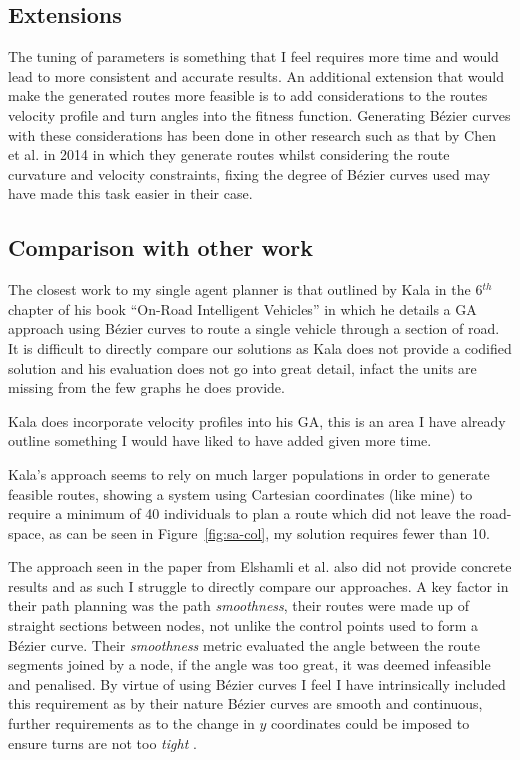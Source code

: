 \subsection{Extensions}

The tuning of parameters is something that I feel requires more time and would lead to more consistent and accurate results. An additional extension that would make the generated routes more feasible is to add considerations to the routes velocity profile and turn angles into the fitness function. Generating Bézier curves with these considerations has been done in other research such as that by Chen et al.\cite{chenQuarticBezierCurve2014} in 2014 in which they generate routes whilst considering the route curvature and velocity constraints, fixing the degree of Bézier curves used may have made this task easier in their case.

\subsection{Comparison with other work}

The closest work to my single agent planner is that outlined by Kala in the 6$^{th}$ chapter of his book ``On-Road Intelligent Vehicles'' in which he details a GA approach using Bézier curves to route a single vehicle through a section of road. It is difficult to directly compare our solutions as Kala does not provide a codified solution and his evaluation does not go into great detail, infact the units are missing from the few graphs he does provide.

Kala does incorporate velocity profiles into his GA, this is an area I have already outline something I would have liked to have added given more time.

Kala's approach seems to rely on much larger populations in order to generate feasible routes, showing a system using Cartesian coordinates (like mine) to require a minimum of 40 individuals to plan a route which did not leave the road-space, as can be seen in Figure~\ref{fig:sa-col}, my solution requires fewer than 10.

The approach seen in the paper from Elshamli et al.\cite{elshamliGeneticAlgorithmDynamic2004} also did not provide concrete results and as such I struggle to directly compare our approaches. A key factor in their path planning was the path \textit{smoothness}, their routes were made up of straight sections between nodes, not unlike the control points used to form a Bézier curve. Their \textit{smoothness} metric evaluated the angle between the route segments joined by a node, if the angle was too great, it was deemed infeasible and penalised. By virtue of using Bézier curves I feel I have intrinsically included this requirement as by their nature Bézier curves are smooth and continuous, further requirements as to the change in $y$ coordinates could be imposed to ensure turns are not too \textit{tight} .

